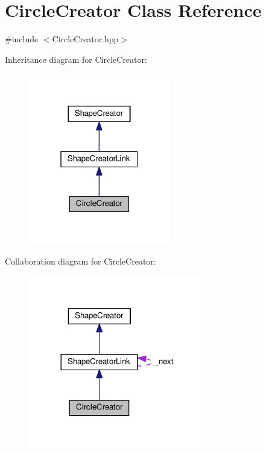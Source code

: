\hypertarget{class_circle_creator}{}\section{Circle\+Creator Class Reference}
\label{class_circle_creator}


{\ttfamily \#include $<$Circle\+Creator.\+hpp$>$}



Inheritance diagram for Circle\+Creator\+:\nopagebreak
\begin{figure}[H]
\begin{center}
\leavevmode
\includegraphics[width=175pt]{class_circle_creator__inherit__graph}
\end{center}
\end{figure}


Collaboration diagram for Circle\+Creator\+:\nopagebreak
\begin{figure}[H]
\begin{center}
\leavevmode
\includegraphics[width=221pt]{class_circle_creator__coll__graph}
\end{center}
\end{figure}
